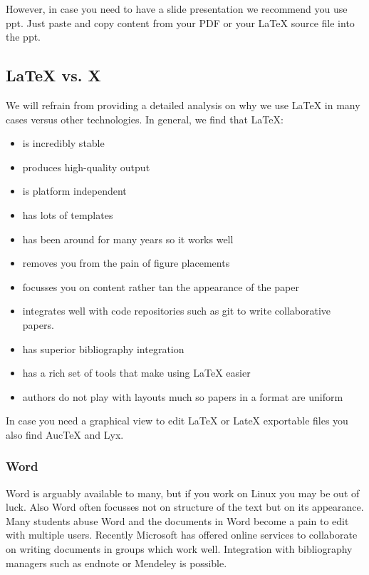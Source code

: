 However, in case you need to have a slide presentation we recommend you
use ppt. Just paste and copy content from your PDF or your LaTeX source
file into the ppt.



\subsection{LaTeX vs. X}\label{latex-vs.-x}

We will refrain from providing a detailed analysis on why we use LaTeX
in many cases versus other technologies. In general, we find that LaTeX:

\begin{itemize}

\item
  is incredibly stable
\item
  produces high-quality output
\item
  is platform independent
\item
  has lots of templates
\item
  has been around for many years so it works well
\item
  removes you from the pain of figure placements
\item
  focusses you on content rather tan the appearance of the paper
\item
  integrates well with code repositories such as git to write
  collaborative papers.
\item
  has superior bibliography integration
\item
  has a rich set of tools that make using LaTeX easier
\item
  authors do not play with layouts much so papers in a format are
  uniform
\end{itemize}

In case you need a graphical view to edit LaTeX or LateX exportable
files you also find AucTeX and Lyx.

\subsubsection{Word}\label{word}

Word is arguably available to many, but if you work on Linux you may be
out of luck. Also Word often focusses not on structure of the text but
on its appearance. Many students abuse Word and the documents in Word
become a pain to edit with multiple users. Recently Microsoft has
offered online services to collaborate on writing documents in groups
which work well. Integration with bibliography managers such as endnote
or Mendeley is possible.

